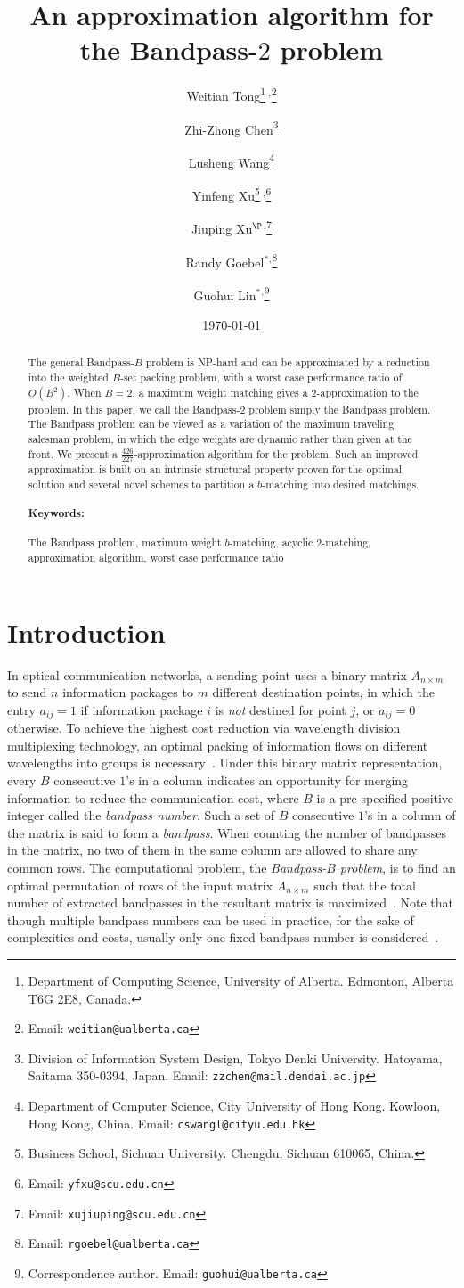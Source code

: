 \documentclass[11pt,twoside]{article}\usepackage{amssymb,latexsym,graphicx,hyperref}\usepackage{epstopdf}
\title{An approximation algorithm for the Bandpass-$2$ problem}
\author{Weitian Tong\thanks{Department of Computing Science, University of Alberta.
Edmonton, Alberta T6G 2E8, Canada.}$~^,$\thanks{Email: {\tt weitian@ualberta.ca}}
\and
Zhi-Zhong Chen\thanks{Division of Information System Design, Tokyo Denki University.
Hatoyama, Saitama 350-0394, Japan.
Email: {\tt zzchen@mail.dendai.ac.jp}}
\and
Lusheng Wang\thanks{Department of Computer Science, City University of Hong Kong.
Kowloon, Hong Kong, China.
Email: {\tt cswangl@cityu.edu.hk}}
\and
Yinfeng Xu\thanks{Business School, Sichuan University.
Chengdu, Sichuan 610065, China.}$~^,$\thanks{Email: {\tt yfxu@scu.edu.cn}}
\and
Jiuping Xu$^\P$$^,$\thanks{Email: {\tt xujiuping@scu.edu.cn}}
\and
Randy Goebel$^*$$^,$\thanks{Email: {\tt rgoebel@ualberta.ca}}
\and
Guohui Lin$^*$$^,$\thanks{Correspondence author.  Email: {\tt guohui@ualberta.ca}}}
\date{\today}
\begin{document}
\maketitle
\begin{abstract}
The general Bandpass-$B$ problem is NP-hard and can be approximated by a reduction into the weighted $B$-set packing problem,
with a worst case performance ratio of $O(B^2)$.
When $B = 2$, a maximum weight matching gives a $2$-approximation to the problem.
In this paper, we call the Bandpass-$2$ problem simply the Bandpass problem.
The Bandpass problem can be viewed as a variation of the maximum traveling salesman problem,
in which the edge weights are dynamic rather than given at the front.
We present a $\frac {426}{227}$-approximation algorithm for the problem.
Such an improved approximation is built on an intrinsic structural property proven for the optimal solution and
several novel schemes to partition a $b$-matching into desired matchings.

\paragraph{Keywords:}
The Bandpass problem, maximum weight $b$-matching, acyclic $2$-matching, approximation algorithm, worst case performance ratio
\end{abstract}



\section{Introduction}
In optical communication networks,
a sending point uses a binary matrix $A_{n \times m}$ to send $n$ information packages to $m$ different destination points,
in which the entry $a_{ij} = 1$ if information package $i$ is {\em not} destined for point $j$, or $a_{ij} = 0$ otherwise.
To achieve the highest cost reduction via wavelength division multiplexing technology,
an optimal packing of information flows on different wavelengths into groups is necessary~\cite{BBN09}. 
Under this binary matrix representation,
every $B$ consecutive $1$'s in a column indicates an opportunity for merging information to reduce the communication cost,
where $B$ is a pre-specified positive integer called the {\em bandpass number}.
Such a set of $B$ consecutive $1$'s in a column of the matrix is said to form a {\em bandpass}.
When counting the number of bandpasses in the matrix, no two of them in the same column are allowed to share any common rows.
The computational problem, the {\em Bandpass-$B$ problem},
is to find an optimal permutation of rows of the input matrix $A_{n \times m}$
such that the total number of extracted bandpasses in the resultant matrix is maximized~\cite{BB04,BBN09,Lin11}.
Note that though multiple bandpass numbers can be used in practice, for the sake of complexities and costs,
usually only one fixed bandpass number is considered~\cite{BBN09}.
\end{document}
